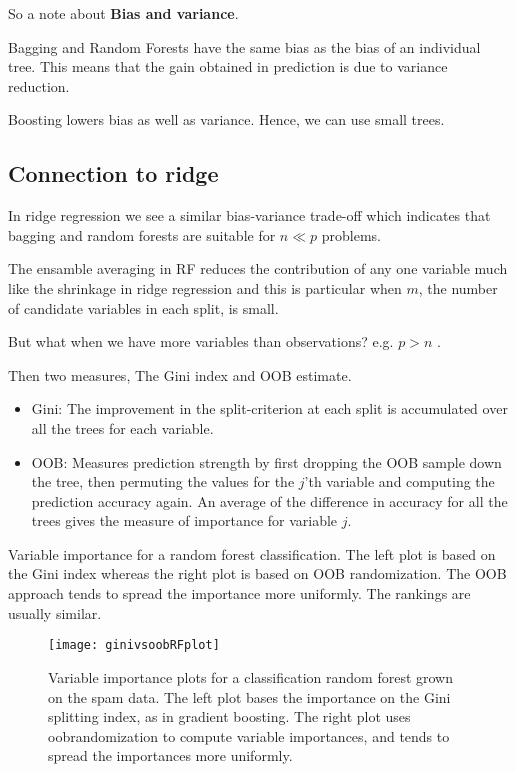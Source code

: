 So a note about \textbf{Bias and variance}. 

Bagging and Random Forests have the same bias as the bias of an
individual tree. This means that the gain obtained in prediction is due to variance reduction.

Boosting lowers bias as well as variance. Hence, we can use small
trees.

\subsection{Connection to ridge}

In ridge regression we see a similar bias-variance trade-off which indicates that bagging and random forests are suitable for $n \ll p$ problems. \cite[p.~38]{lecture9}

The ensamble averaging in RF reduces the contribution of any one variable much like the shrinkage in ridge regression and this is particular when $m$, the number of candidate variables in each split, is small.

But what when we have more variables than observations? e.g. $p > n$ \cite[p.~47-49]{lecture9}. 

Then two measures, The Gini index and OOB estimate. 

\begin{itemize}
  \item Gini: The improvement in the split-criterion at each split is accumulated over all the trees for each variable.
  \item OOB: Measures prediction strength by first dropping the OOB sample down the tree, then permuting the values for the $j$'th variable and computing the prediction accuracy again. An average of the difference in accuracy for all the trees gives the measure of importance for variable $j$.
\end{itemize}

Variable importance for a
random forest classification.
The left plot is based on the
Gini index whereas the right
plot is based on OOB
randomization.
The OOB approach tends to
spread the importance more
uniformly. The rankings are
usually similar.

\begin{figure}[H]
  \centering
  \texttt{[image: ginivsoobRFplot]}
  \caption{Variable importance plots for a classification random forest grown on the spam data. The left plot bases the importance on the Gini splitting index, as in gradient boosting. The right plot uses oobrandomization to compute variable importances, and tends to spread the importances more uniformly.}\label{fig:ginivsoobRFplot}
\end{figure}

